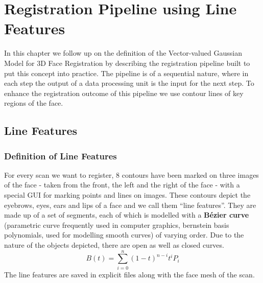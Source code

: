 \chapter{Registration Pipeline using Line Features}
In this chapter we follow up on the definition of the Vector-valued Gaussian Model for 3D Face Registration by describing the registration pipeline built to put this concept into practice. The pipeline is of a sequential nature, where in each step the output of a data processing unit is the input for the next step. To enhance the registration outcome of this pipeline we use contour lines of key regions of the face. 
\section{Line Features}
\subsection{Definition of Line Features}
For every scan we want to register, 8 contours have been marked on three images of the face - taken from the front, the left and the right of the face - with a special GUI for marking points and lines on images. These contours depict the eyebrows, eyes, ears and lips of a face and we call them ``line features''. They are made up of a set of segments, each of  which is modelled with a \textbf{B\'{e}zier curve} (parametric curve frequently used in computer graphics, bernstein basis polynomials, used for
modelling smooth curves) of varying order. Due to the nature of the objects depicted, there are open as well as closed curves. 
\begin{equation}
    B(t)=\sum_{i=0}^{n}(1-t)^{n-i}t^iP_{i}
\end{equation}
The line features are saved in explicit files along with the face mesh of the scan.

